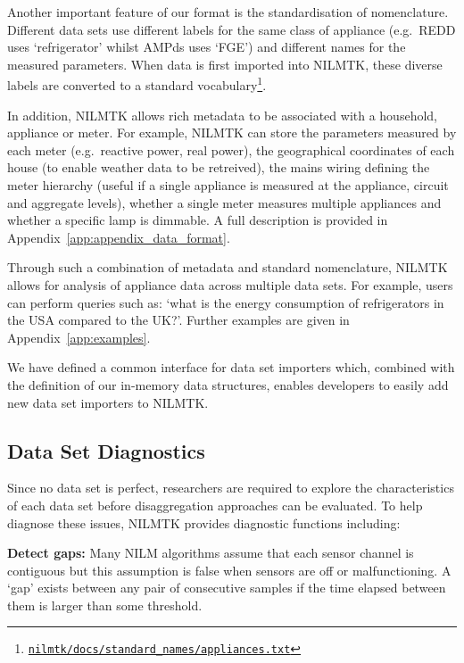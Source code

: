 \documentclass{sig-alternate}
\newcommand{\appref}[1]{Appendix~\ref{#1}}
\begin{document}
Another important feature of our format is the standardisation of nomenclature.  Different data sets use different labels for the same class of appliance (e.g.\ REDD uses `refrigerator' whilst AMPds uses `FGE') and different names for the measured parameters.  When data is first imported into NILMTK, these diverse labels are converted to a standard vocabulary\footnote{\href{https://github.com/nilmtk/nilmtk/blob/master/docs/standard_names/appliances.txt}{\texttt{nilmtk/docs/standard\_names/appliances.txt}}}.

In addition, NILMTK allows rich metadata to be associated with a
household, appliance or meter.  For example, NILMTK can store the
parameters measured by each meter (e.g.\ reactive power, real power),
the geographical coordinates of each house (to enable weather data to be retreived), the mains wiring
defining the meter hierarchy (useful if a single appliance is measured
at the appliance, circuit and aggregate levels), whether a single
meter measures multiple appliances and whether a specific lamp is
dimmable. A full description is provided in
\appref{app:appendix_data_format}.

Through such a combination of metadata and standard nomenclature, NILMTK allows for analysis of appliance data across multiple data sets. For example, users can perform queries such as:
`what is the energy consumption of refrigerators in the USA
compared to the UK?'. Further examples are given in
Appendix~\ref{app:examples}.

We have defined a common interface for data set importers
which, combined with the definition of our in-memory data structures,
enables developers to easily add new data set
importers to NILMTK.

\subsection{Data Set Diagnostics}
\label{sec:diagnostic_definitions}

\noindent
Since no data set is perfect, researchers are required to explore the characteristics of each data set before
disaggregation approaches can be evaluated.  To help diagnose these issues, NILMTK
provides diagnostic functions including:

\textbf{Detect gaps:} Many NILM algorithms assume that each sensor channel is
contiguous but this assumption is false when sensors are off or
malfunctioning.  A `gap' exists between any pair of consecutive
samples if the time elapsed between them is larger than
some threshold.
\end{document}
